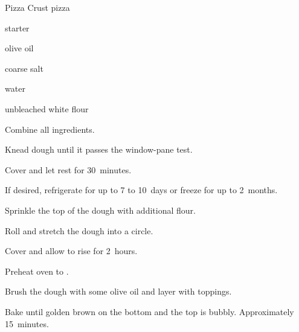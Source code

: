 \begin{recipe}{Pizza Crust}{}{ pizza}

\begin{ingredients}
\item {} starter
\item {} olive oil
\item {} coarse salt
\item {} water
\item {} unbleached white flour
\end{ingredients}

\begin{directions}
\item Combine all ingredients.
\item Knead dough until it passes the window-pane test.
\item Cover and let rest for 30~minutes.
\item If desired, refrigerate for up to 7 to 10~days or freeze for up to 2~months.
\item Sprinkle the top of the dough with additional flour.
\item Roll and stretch the dough into a circle.
\item Cover and allow to rise for 2~hours.
\item Preheat oven to .
\item Brush the dough with some olive oil and layer with toppings.
\item Bake until golden brown on the bottom and the top is bubbly. Approximately 15~minutes.
\end{directions}
\end{recipe}
